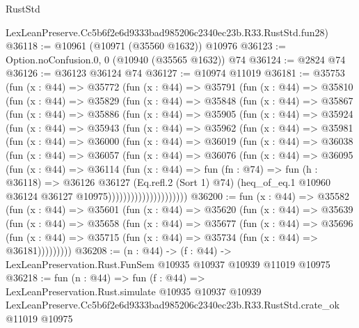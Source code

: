 \begin{lexlean}{RustStd}
\begin{coremodule}
    LexLeanPreserve.Cc5b6f2e6d9333bad985206c2340ec23b.R33.RustStd.fun28)
@36118 := @10961 (@10971 (@35560 @1632)) @10976
@36123 := Option.noConfusion.{0, 0} (@10940 (@35565 @1632)) @74
@36124 := @2824 @74
@36126 := @36123 @36124 @74
@36127 := @10974 @11019
@36181 := @35753
    (fun (x : @44) =>
    @35772
      (fun (x : @44) =>
      @35791
        (fun (x : @44) =>
        @35810
          (fun (x : @44) =>
          @35829
            (fun (x : @44) =>
            @35848
              (fun (x : @44) =>
              @35867
                (fun (x : @44) =>
                @35886
                  (fun (x : @44) =>
                  @35905
                    (fun (x : @44) =>
                    @35924
                      (fun (x : @44) =>
                      @35943
                        (fun (x : @44) =>
                        @35962
                          (fun (x : @44) =>
                          @35981
                            (fun (x : @44) =>
                            @36000
                              (fun (x : @44) =>
                              @36019
                                (fun (x : @44) =>
                                @36038
                                  (fun (x : @44) =>
                                  @36057
                                    (fun (x : @44) =>
                                    @36076
                                      (fun (x : @44) =>
                                      @36095
                                        (fun (x : @44) =>
                                        @36114
                                          (fun (x : @44) =>
                                          fun (fn : @74) =>
                                          fun (h : @36118) =>
                                          @36126
                                            @36127
                                            (Eq.refl.{2} (Sort 1) @74)
                                            (heq_of_eq.{1}
                                              @10960
                                              @36124
                                              @36127
                                              @10975)))))))))))))))))))))
@36200 := fun (x : @44) =>
  @35582
    (fun (x : @44) =>
    @35601
      (fun (x : @44) =>
      @35620
        (fun (x : @44) =>
        @35639
          (fun (x : @44) =>
          @35658
            (fun (x : @44) =>
            @35677
              (fun (x : @44) =>
              @35696
                (fun (x : @44) => @35715 (fun (x : @44) => @35734 (fun (x : @44) => @36181)))))))))
@36208 := (n : @44) ->
  (f : @44) -> LexLeanPreservation.Rust.FunSem @10935 @10937 @10939 @11019 @10975
@36218 := fun (n : @44) =>
  fun (f : @44) =>
  LexLeanPreservation.Rust.simulate
    @10935
    @10937
    @10939
    LexLeanPreserve.Cc5b6f2e6d9333bad985206c2340ec23b.R33.RustStd.crate_ok
    @11019
    @10975
\end{coremodule}
\end{lexlean}
